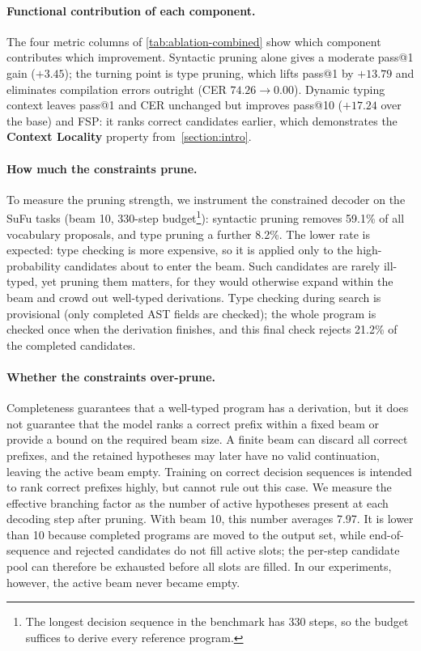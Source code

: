 \paragraph{Functional contribution of each component.}
The four metric columns of \autoref{tab:ablation-combined} show which component contributes which improvement.
Syntactic pruning alone gives a moderate pass@1 gain ($+3.45$); the turning point is type pruning, which lifts pass@1 by $+13.79$ and eliminates compilation errors outright (CER $74.26 \to 0.00$).
Dynamic typing context leaves pass@1 and CER unchanged but improves pass@10 ($+17.24$ over the base) and FSP: it ranks correct candidates earlier, which demonstrates the \textbf{Context Locality} property from~\autoref{section:intro}.

\paragraph{How much the constraints prune.}
To measure the pruning strength, we instrument the constrained decoder on the SuFu tasks (beam 10, 330-step budget\footnote{The longest decision sequence in the benchmark has 330 steps, so the budget suffices to derive every reference program.}): syntactic pruning removes 59.1\% of all vocabulary proposals, and type pruning a further 8.2\%.
The lower rate is expected: type checking is more expensive, so it is applied only to the high-probability candidates about to enter the beam.
Such candidates are rarely ill-typed, yet pruning them matters, for they would otherwise expand within the beam and crowd out well-typed derivations.
Type checking during search is provisional (only completed AST fields are checked); the whole program is checked once when the derivation finishes, and this final check rejects 21.2\% of the completed candidates.

\paragraph{Whether the constraints over-prune.}
Completeness guarantees that a well-typed program has a derivation, but it does not guarantee that the model ranks a correct prefix within a fixed beam or provide a bound on the required beam size.
A finite beam can discard all correct prefixes, and the retained hypotheses may later have no valid continuation, leaving the active beam empty.
Training on correct decision sequences is intended to rank correct prefixes highly, but cannot rule out this case.
We measure the effective branching factor as the number of active hypotheses present at each decoding step after pruning.
With beam 10, this number averages 7.97.
It is lower than 10 because completed programs are moved to the output set, while end-of-sequence and rejected candidates do not fill active slots; the per-step candidate pool can therefore be exhausted before all slots are filled.
In our experiments, however, the active beam never became empty.


